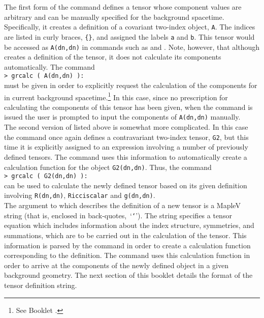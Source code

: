 \documentclass{article}
\begin{document}
The first form of the command defines a tensor whose component values
are arbitrary and can be manually specified for the background
spacetime. Specifically, it creates a definition of a covariant
two-index object, \texttt{A}. The indices are listed in curly braces,
\texttt{\{\}}, and assigned the labels \texttt{a} and \texttt{b}. This
tensor would be accessed as \texttt{A(dn,dn)} in commands such as
 and . Note, however, that although
 creates a definition of the tensor, it does not
calculate its components automatically. The command\\

\noindent\texttt{> grcalc ( A(dn,dn) ):}\\

\noindent must be given in order to explicitly request the calculation
of the components for in current background spacetime.\footnote{See
Booklet \grCalcRef.} In this case, since no prescription for
calculating the components of this tensor has been given, when the
 command is issued the user is prompted to input the
components of \texttt{A(dn,dn)} manually.\\

The second version of  listed above is somewhat more
complicated. In this case the command once again defines a
contravariant two-index tensor, \texttt{G2}, but this time it is
explicitly assigned to an expression involving a number of previously
defined tensors. The  command uses this information to
automatically create a calculation function for the object
\texttt{G2(dn,dn)}. Thus, the command\\

\noindent\texttt{> grcalc ( G2(dn,dn) ):}\\

\noindent can be used to calculate the newly defined tensor based on its
given definition involving \texttt{R(dn,dn)}, \texttt{Ricciscalar} and 
\texttt{g(dn,dn)}.\\

The argument to  which describes the definition of a new
tensor is a MapleV string (that is, enclosed in
back-quotes,~`\texttt{`}'). The string specifies a tensor equation
which includes information about the index structure, symmetries, and
summations, which are to be carried out in the calculation of the
tensor. This information is parsed by the  command in
order to create a calculation function corresponding to the
definition. The  command uses this calculation function
in order to arrive at the components of the newly defined object in a
given background geometry. The next section of this booklet details the
format of the tensor definition string.\\
\end{document}
